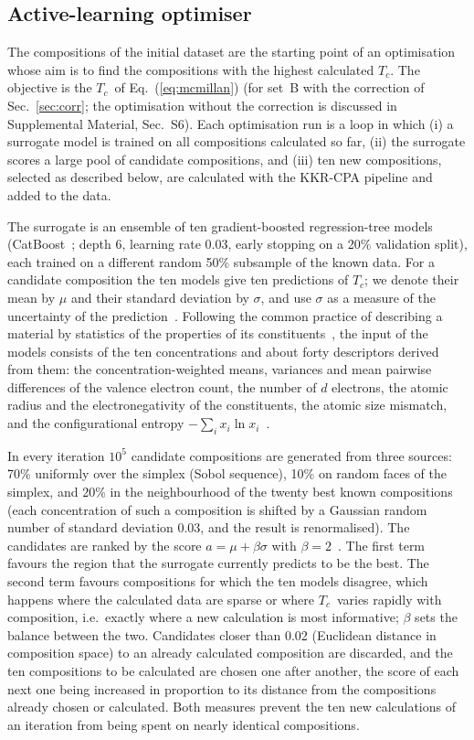 \documentclass[aps,prb,reprint,superscriptaddress,twocolumn,floatfix]{revtex4-2}
\newcommand{\Tc}{$T_c$}
\newcommand{\SI}[1]{Supplemental Material, Sec.~#1}
\begin{document}
\subsection{Active-learning optimiser}
\label{sec:optimiser}

The compositions of the initial dataset are the starting point of an optimisation whose
aim is to find the compositions with the highest calculated \Tc. The objective is the \Tc\ of
Eq.~(\ref{eq:mcmillan}) (for set~B with the correction of Sec.~\ref{sec:corr}; the
optimisation without the correction is discussed in \SI{S6}). Each optimisation run is a loop
in which (i) a surrogate model is trained on all compositions calculated so far, (ii) the
surrogate scores a large pool of candidate compositions, and (iii) ten new compositions,
selected as described below, are calculated with the KKR-CPA pipeline and added to the data.

The surrogate is an ensemble of ten gradient-boosted regression-tree models
(CatBoost~\cite{Prokhorenkova2018}; depth 6, learning rate 0.03, early stopping on a 20\%
validation split), each trained on a different random 50\% subsample of the known data. For
a candidate composition the ten models give ten predictions of \Tc; we denote their mean by
$\mu$ and their standard deviation by $\sigma$, and use $\sigma$ as a measure of the
uncertainty of the prediction~\cite{Lakshminarayanan2017}. Following the common practice of
describing a material by statistics of the properties of its
constituents~\cite{Ward2016,Stanev2018}, the input of the models consists of the ten
concentrations and about forty descriptors derived from them: the concentration-weighted
means, variances and mean pairwise differences of the valence electron count, the number of
$d$ electrons, the atomic radius and the electronegativity of the constituents, the
atomic size mismatch, and the configurational entropy
$-\sum_i x_i \ln x_i$~\cite{Zhang2008}.

In every iteration $10^5$ candidate compositions are generated from three sources: 70\%
uniformly over the simplex (Sobol sequence), 10\% on random faces of the simplex, and 20\% in
the neighbourhood of the twenty best known compositions (each concentration of such a
composition is shifted by a Gaussian random number of standard deviation 0.03, and the
result is renormalised). The candidates are ranked by the score
$a = \mu + \beta\sigma$ with $\beta = 2$~\cite{Srinivas2010}. The first term favours the
region that the surrogate currently predicts to be the best. The second term favours
compositions for which the ten models disagree, which happens where the calculated data
are sparse or where \Tc\ varies rapidly with composition, i.e.\ exactly where a new
calculation is most informative; $\beta$ sets the balance between the two.
Candidates closer than 0.02 (Euclidean distance in composition space) to an already
calculated composition are discarded, and the ten compositions to be calculated are chosen
one after another, the score of each next one being increased in proportion to its distance
from the compositions already chosen or calculated. Both measures prevent the ten new
calculations of an iteration from being spent on nearly identical compositions.
\end{document}
